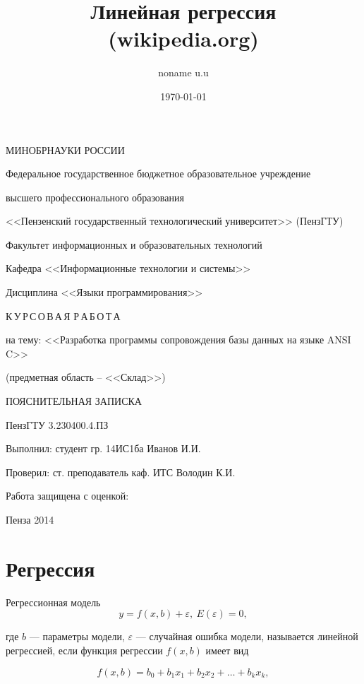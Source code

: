 \documentclass[a4paper,14pt]{article}
\title{Линейная регрессия \\ (wikipedia.org)}
\author{noname u.u}
\date{\today}
\begin{document}
\newpage
\thispagestyle{empty}
\begin{center}
МИНОБРНАУКИ РОССИИ

Федеральное государственное бюджетное образовательное учреждение 

высшего профессионального образования

<<Пензенский государственный технологический университет>>
(ПензГТУ)

\vspace{36pt}

Факультет информационных и образовательных технологий

Кафедра <<Информационные технологии и системы>>

Дисциплина <<Языки программирования>>

\vspace{36pt}

К\,У\,Р\,С\,О\,В\,А\,Я Р\,А\,Б\,О\,Т\,А

на тему: <<Разработка программы сопровождения базы данных на языке ANSI C>>

(предметная область – <<Склад>>)

\vspace{72pt}

ПОЯСНИТЕЛЬНАЯ ЗАПИСКА

ПензГТУ 3.230400.4.ПЗ

\vspace{72pt}

\parbox{12cm}{
Выполнил: студент гр. 14ИС1ба Иванов И.И.

Проверил: ст. преподаватель каф. ИТС Володин К.И.

Работа защищена с оценкой:~\hrulefill
}

\vfill

Пенза 2014
\end{center}

\newpage
\section{Регрессия}

Регрессионная модель
\[
y=f(x,b)+\varepsilon, ~E(\varepsilon)=0,
\]

где $b$ — параметры модели, $\varepsilon$ — случайная ошибка модели, называется линейной регрессией, если функция регрессии $f(x,b)$ имеет вид

\begin{equation}
f(x,b)=b_0+b_1 x_1+b_2 x_2+\ldots+b_k x_k,
\end{equation}
\end{document}
